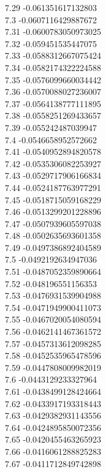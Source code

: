 {7.29	-0.061351617132803\\
7.3	-0.0607116429887672\\
7.31	-0.0600783050973025\\
7.32	-0.059451535447075\\
7.33	-0.0588312667075424\\
7.34	-0.0582174322224588\\
7.35	-0.0576099660034442\\
7.36	-0.0570088027236007\\
7.37	-0.0564138777111895\\
7.38	-0.0558251269433657\\
7.39	-0.055242487039947\\
7.4	-0.0546658952572662\\
7.41	-0.0540952894820578\\
7.42	-0.0535306082253927\\
7.43	-0.0529717906166834\\
7.44	-0.0524187763977291\\
7.45	-0.0518715059168229\\
7.46	-0.0513299201228896\\
7.47	-0.0507939605597038\\
7.48	-0.0502635693601358\\
7.49	-0.0497386892404589\\
7.5	-0.0492192634947036\\
7.51	-0.0487052359890664\\
7.52	-0.048196551156353\\
7.53	-0.0476931539904988\\
7.54	-0.0471949900411073\\
7.55	-0.0467020054080594\\
7.56	-0.0462141467361572\\
7.57	-0.0457313612098285\\
7.58	-0.0452535965478596\\
7.59	-0.0447808009982019\\
7.6	-0.0443129233327964\\
7.61	-0.0438499128424664\\
7.62	-0.0433917193318443\\
7.63	-0.0429382931143556\\
7.64	-0.0424895850072356\\
7.65	-0.0420455463265923\\
7.66	-0.0416061288825283\\
7.67	-0.0411712849742898\\
}
